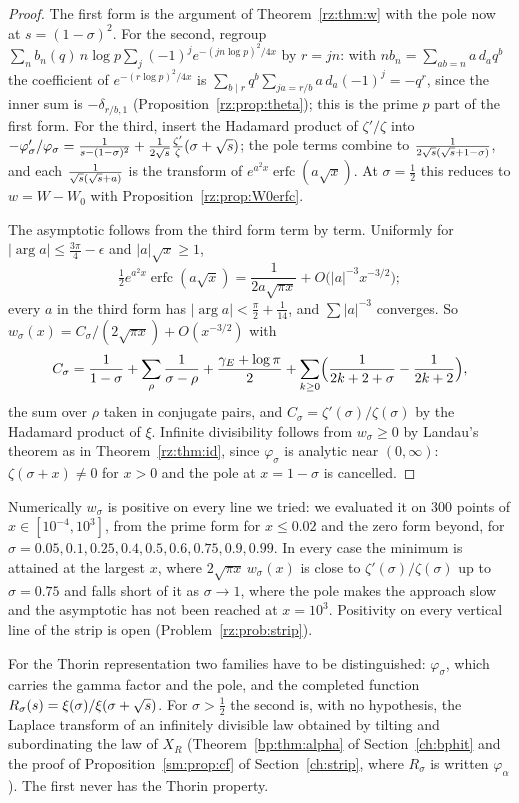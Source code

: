 \begin{proof}
The first form is the argument of Theorem~\ref{rz:thm:w} with the pole now at $s=(1-\sigma)^2$. For the second, regroup $\sum_nb_n(q)\,n\log p\sum_j(-1)^je^{-(jn\log p)^2/4x}$ by $r=jn$: with $nb_n=\sum_{ab=n}a\,d_aq^b$ the coefficient of $e^{-(r\log p)^2/4x}$ is $\sum_{b\mid r}q^b\sum_{ja=r/b}a\,d_a(-1)^j=-q^r$, since the inner sum is $-\delta_{r/b,1}$ (Proposition~\ref{rz:prop:theta}); this is the prime $p$ part of the first form. For the third, insert the Hadamard product of $\zeta'/\zeta$ into $-\varphi_\sigma'/\varphi_\sigma=\frac1{s-(1-\sigma)^2}+\frac1{2\sqrt{s}}\frac{\zeta'}\zeta(\sigma+\sqrt{s})$; the pole terms combine to $\frac1{2\sqrt{s}(\sqrt{s}+1-\sigma)}$, and each $\frac1{\sqrt{s}(\sqrt{s}+a)}$ is the transform of $e^{a^2x}\operatorname{erfc}(a\sqrt x)$. At $\sigma=\frac12$ this reduces to $w=W-W_0$ with Proposition~\ref{rz:prop:W0erfc}.

The asymptotic follows from the third form term by term. Uniformly for $|\arg a|\le\frac{3\pi}4-\epsilon$ and $|a|\sqrt x\ge1$,
\[
\tfrac12e^{a^2x}\operatorname{erfc}(a\sqrt x)=\frac1{2a\sqrt{\pi x}}+O\bigl(|a|^{-3}x^{-3/2}\bigr);
\]
every $a$ in the third form has $|\arg a|<\frac\pi2+\frac1{14}$, and $\sum|a|^{-3}$ converges. So $w_\sigma(x)=C_\sigma/(2\sqrt{\pi x})+O(x^{-3/2})$ with
\[
C_\sigma=\frac1{1-\sigma}+\sum_\rho\frac1{\sigma-\rho}+\frac{\gamma_E+\log\pi}2+\sum_{k\ge0}\Bigl(\frac1{2k+2+\sigma}-\frac1{2k+2}\Bigr),
\]
the sum over $\rho$ taken in conjugate pairs, and $C_\sigma=\zeta'(\sigma)/\zeta(\sigma)$ by the Hadamard product of $\xi$. Infinite divisibility follows from $w_\sigma\ge0$ by Landau's theorem as in Theorem~\ref{rz:thm:id}, since $\varphi_\sigma$ is analytic near $(0,\infty)$: $\zeta(\sigma+x)\ne0$ for $x>0$ and the pole at $x=1-\sigma$ is cancelled.
\end{proof}

Numerically $w_\sigma$ is positive on every line we tried: we evaluated it on $300$ points of $x\in[10^{-4},10^3]$, from the prime form for $x\le0.02$ and the zero form beyond, for $\sigma=0.05,0.1,0.25,0.4,0.5,0.6,0.75,0.9,0.99$. In every case the minimum is attained at the largest $x$, where $2\sqrt{\pi x}\,w_\sigma(x)$ is close to $\zeta'(\sigma)/\zeta(\sigma)$ up to $\sigma=0.75$ and falls short of it as $\sigma\to1$, where the pole makes the approach slow and the asymptotic has not been reached at $x=10^3$. Positivity on every vertical line of the strip is open (Problem~\ref{rz:prob:strip}).

For the Thorin representation two families have to be distinguished: $\varphi_\sigma$, which carries the gamma factor and the pole, and the completed function $R_\sigma(s)=\xi(\sigma)/\xi(\sigma+\sqrt{s})$. For $\sigma>\frac12$ the second is, with no hypothesis, the Laplace transform of an infinitely divisible law obtained by tilting and subordinating the law of $X_R$ (Theorem~\ref{bp:thm:alpha} of Section~\ref{ch:bphit} and the proof of Proposition~\ref{sm:prop:cf} of Section~\ref{ch:strip}, where $R_\sigma$ is written $\varphi_\alpha$). The first never has the Thorin property.

